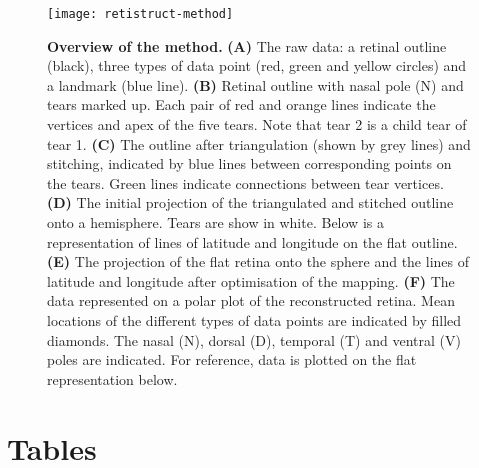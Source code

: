 \documentclass[10pt]{article}
\begin{document}
\begin{figure}[!ht]
  \texttt{[image: retistruct-method]}
  
  \vspace*{-4.54in}

  \mbox{}

  \vspace*{2.27in}

  \caption{\textbf{Overview of the method.} \textbf{(A)} The raw data:
    a retinal outline (black), three types of data point (red, green
    and yellow circles) and a landmark (blue line). \textbf{(B)}
    Retinal outline with nasal pole (N) and tears marked up. Each pair
    of red and orange lines indicate the vertices and apex of the five
    tears. Note that tear 2 is a child tear of tear 1. \textbf{(C)}
    The outline after triangulation (shown by grey lines) and
    stitching, indicated by blue lines between corresponding points on
    the tears. Green lines indicate connections between tear vertices.
    \textbf{(D)} The initial projection of the triangulated and
    stitched outline onto a hemisphere. Tears are show in white. Below
    is a representation of lines of latitude and longitude on the flat
    outline. \textbf{(E)} The projection of the flat retina onto the
    sphere and the lines of latitude and longitude after optimisation
    of the mapping. \textbf{(F)} The data represented on a polar plot
    of the reconstructed retina. Mean locations of the different types
    of data points are indicated by filled diamonds. The nasal (N),
    dorsal (D), temporal (T) and ventral (V) poles are indicated. For
    reference, data is plotted on the flat representation
    below.
    }
  \label{fold-sphere:fig:method}
\end{figure}



\section*{Tables}
\end{document}
